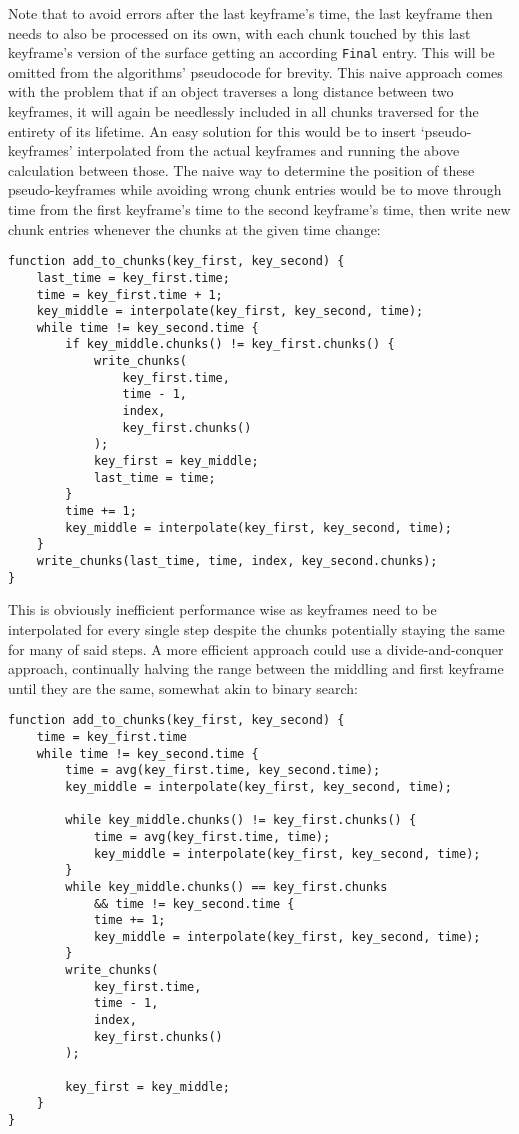 Note that to avoid errors after the last keyframe's time,
the last keyframe then needs to also be processed on its own,
with each chunk touched by this last keyframe's version of the surface getting an according \verb|Final| entry.
This will be omitted from the algorithms' pseudocode for brevity.
\newline
This naive approach comes with the problem that if an object traverses a long distance between two keyframes,
it will again be needlessly included in all chunks traversed for the entirety of its lifetime.
An easy solution for this would be to insert `pseudo-keyframes' interpolated from the actual keyframes
and running the above calculation between those.
\newline
The naive way to determine the position of these pseudo-keyframes while avoiding wrong chunk entries
would be to move through time from the first keyframe's time to the second keyframe's time,
then write new chunk entries whenever the chunks at the given time change:

\begin{verbatim}
function add_to_chunks(key_first, key_second) {
	last_time = key_first.time;
	time = key_first.time + 1;
	key_middle = interpolate(key_first, key_second, time);
	while time != key_second.time {
		if key_middle.chunks() != key_first.chunks() {
			write_chunks(
                key_first.time,
                time - 1,
                index,
                key_first.chunks()
            );
			key_first = key_middle;
			last_time = time;
		}
		time += 1;
		key_middle = interpolate(key_first, key_second, time);
	}
	write_chunks(last_time, time, index, key_second.chunks);
}
\end{verbatim}

This is obviously inefficient performance wise as keyframes need to be interpolated for every single step
despite the chunks potentially staying the same for many of said steps.
A more efficient approach could use a divide-and-conquer approach,
continually halving the range between the middling and first keyframe until they are the same,
somewhat akin to binary search:

\begin{verbatim}
function add_to_chunks(key_first, key_second) {
	time = key_first.time
	while time != key_second.time {
		time = avg(key_first.time, key_second.time);
		key_middle = interpolate(key_first, key_second, time);
		
		while key_middle.chunks() != key_first.chunks() {
			time = avg(key_first.time, time);
			key_middle = interpolate(key_first, key_second, time);
		}
		while key_middle.chunks() == key_first.chunks
            && time != key_second.time {
			time += 1;
			key_middle = interpolate(key_first, key_second, time);
		}
		write_chunks(
            key_first.time, 
            time - 1, 
            index,
            key_first.chunks()
        );
		
		key_first = key_middle;
	}
}
\end{verbatim}

